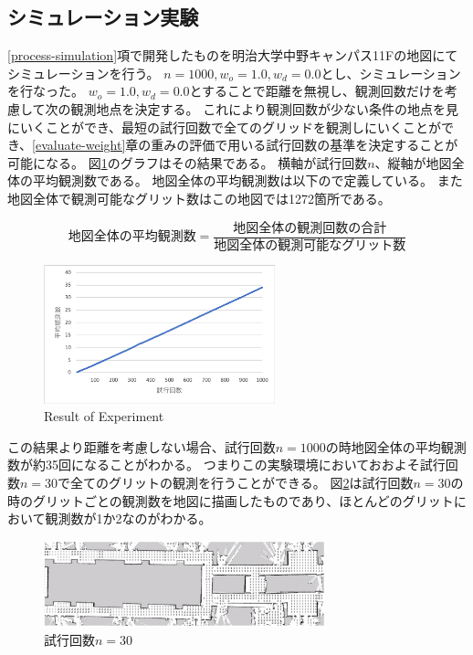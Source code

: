\documentclass{jsarticle}
\begin{document}
\subsection{シミュレーション実験}
\label{run-simulation}
\ref{process-simulation}項で開発したものを明治大学中野キャンパス11Fの地図にてシミュレーションを行う。
$n=1000,w_o=1.0,w_d=0.0$とし、シミュレーションを行なった。
$w_o=1.0,w_d=0.0$とすることで距離を無視し、観測回数だけを考慮して次の観測地点を決定する。
これにより観測回数が少ない条件の地点を見にいくことができ、最短の試行回数で全てのグリッドを観測しにいくことができ、\ref{evaluate-weight}章の重みの評価で用いる試行回数の基準を決定することが可能になる。
図\ref{fig: result of experiments}のグラフはその結果である。
横軸が試行回数$n$、縦軸が地図全体の平均観測数である。
地図全体の平均観測数は以下ので定義している。
また地図全体で観測可能なグリット数はこの地図では1272箇所である。

\begin{equation}
  地図全体の平均観測数 = \frac{地図全体の観測回数の合計}{地図全体の観測可能なグリット数}
	\label{eqn: average-in-map}
\end{equation}

\begin{figure}[tbh]
 \centering
  \includegraphics[height=40mm]{fig/n1000.eps}
  \vspace*{-4mm}
  \caption{Result of Experiment}
  \label{fig: result of experiments}
\end{figure}

この結果より距離を考慮しない場合、試行回数$n=1000$の時地図全体の平均観測数が約35回になることがわかる。
つまりこの実験環境においておおよそ試行回数$n=30$で全てのグリットの観測を行うことができる。
図\ref{fig: n30}は試行回数$n=30$の時のグリットごとの観測数を地図に描画したものであり、ほとんどのグリットにおいて観測数が1か2なのがわかる。


\begin{figure}[tbh]
 \centering
  \includegraphics[height=25mm]{fig/n30.eps}
  \vspace*{-4mm}
  \caption{試行回数$n=30$}
  \label{fig: n30}
\end{figure}
\end{document}
